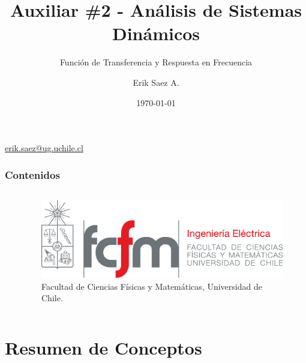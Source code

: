 \documentclass[
    10pt,
    aspectratio=169,
    xcolor={dvipsnames},
    spanish,
    ]{beamer}
\title[Auxiliar \#2 - Análisis de Sistemas Dinámicos]{\bfseries Auxiliar \#2 - Análisis de Sistemas Dinámicos}
\subtitle{Función de Transferencia y Respuesta en Frecuencia}
\author[Erik Saez A.]{Erik Saez A.}
\institute[UChile]{Department of Electrical Engineering \\ Universidad de Chile}
\date{\today}
\begin{document}
\begin{frame}
  \titlepage
  \centering
   \href{mailto:erik.saez@ug.uchile.cl}{erik.saez@ug.uchile.cl} \hspace{.2cm}
\end{frame}

\begin{frame}
  \frametitle{Contenidos}
  \centering
  \begin{columns}
    \begin{column}{0.4\textwidth}
      \tableofcontents
    \end{column}
    \begin{column}{0.5\textwidth}
      \begin{figure}
        \centering
        \includegraphics[width=\textwidth]{fcfm_die}
        \caption{Facultad de Ciencias Físicas y Matemáticas, Universidad de Chile.}
      \end{figure}
    \end{column}
  \end{columns}  
\end{frame}

\section{Resumen de Conceptos}
\end{document}
